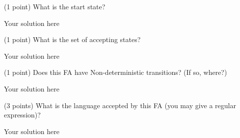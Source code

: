 \documentclass[12pt]{article}
\newenvironment{question}[2][Question]{\begin{trivlist}
\item[\hskip \labelsep {\bfseries #1}\hskip \labelsep {\bfseries #2.}]}{\end{trivlist}}
\newenvironment{solution}[1][Solution:]{\begin{trivlist}
\item[\hskip \labelsep {\bfseries #1}\hskip \labelsep {\bfseries}]\color{blue}}{\end{trivlist}}
\begin{document}
\begin{question}{3}
\begin{enumerate}[(a)]
	\item (1 point) What is the start state?
\\  \;
    \begin{solution}
       Your solution here
    \end{solution}
	\item (1 point) What is the set of accepting states?
\\  \;
    \begin{solution}
       Your solution here
    \end{solution}
	\item (1 point) Does this FA have Non-deterministic transitions? (If so, where?)
\\  \;
    \begin{solution}
       Your solution here
    \end{solution}
	\item (3 points) What is the language accepted by this FA (you may give a regular expression)?
\\  \;
    \begin{solution}
       Your solution here
    \end{solution}

\end{enumerate}
\end{question}

\clearpage
\end{document}
